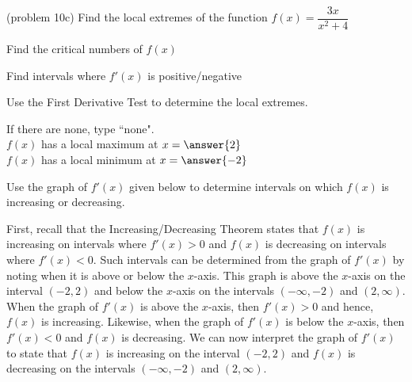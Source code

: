 \documentclass[handout]{ximera}
\begin{document}
\begin{problem}(problem 10c)
Find the local extremes of the function $f(x) = \dfrac{3x}{x^2 + 4}$\\
\begin{hint}
Find the critical numbers of $f(x)$
\end{hint}
\begin{hint}
Find intervals where $f'(x)$ is positive/negative
\end{hint}
\begin{hint}
Use the First Derivative Test to determine the local extremes.
\end{hint}

If there are none, type ``none".\\
$f(x)$ has a local maximum at $x = \answer{2}$\\
$f(x)$ has a local minimum at $x = \answer{-2}$
\end{problem}




\begin{example}[example 11]
Use the graph of $f'(x)$ given below to determine intervals on which $f(x)$
is increasing or decreasing.

\begin{image}
\end{image}


First, recall that the Increasing/Decreasing Theorem states that $f(x)$ is 
increasing on intervals where $f'(x) > 0$ and
$f(x)$ is decreasing on intervals where $f'(x) < 0$.
Such intervals can be determined from the graph of $f'(x)$ by noting when it is 
above or below the $x$-axis.
This graph is above the $x$-axis on the interval $(-2, 2)$ and below the $x$-axis on the 
intervals $(-\infty, -2)$
and $(2, \infty)$. When the graph of $f'(x)$ is above the $x$-axis, then $f'(x)>0$ and hence, $f(x)$
is increasing. Likewise, when the graph of $f'(x)$ is below the $x$-axis, 
then $f'(x)<0$ and $f(x)$ is decreasing.
We can now interpret the graph of $f'(x)$ to state that $f(x)$ is increasing on the 
interval $(-2, 2)$ 
and $f(x)$ is decreasing on the intervals $(-\infty, -2)$ and $(2, \infty)$.




\end{example}
\end{document}
